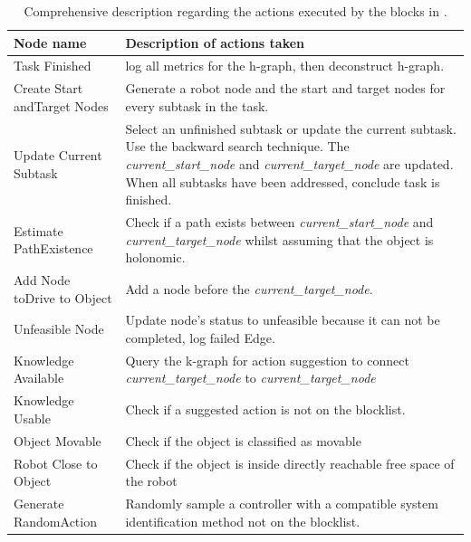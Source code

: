 

\begin{table}[H]
\caption{Comprehensive description regarding the actions executed by the blocks in .}%
\label{table:explainer_h-graph_figures_nodes}
\centering
{}
\begin{tabular}%
  {>{\raggedright\arraybackslash}p{}%
    >{\raggedright\arraybackslash}p{}}
\textbf{Node name} & \textbf{Description of actions taken}\\\toprule
Task Finished & log all metrics for the \ac{h-graph}, then deconstruct \ac{h-graph}.\\
Create Start and\newline Target Nodes & Generate a robot node and the start and target nodes for every subtask in the task.\\
Update Current Subtask & Select an unfinished subtask or update the current subtask. Use the backward search technique. The \textit{current\_start\_node} and \textit{current\_target\_node} are updated. When all subtasks have been addressed, conclude task is finished. \\
Estimate Path\newline Existence & Check if a path exists between \textit{current\_start\_node} and \textit{current\_target\_node} whilst assuming that the object is holonomic.\\
Add Node to\newline Drive to Object & Add a node before the \textit{current\_target\_node}.\\
Unfeasible Node & Update node's status to unfeasible because it can not be completed, log failed Edge.\\
Knowledge Available& Query the \ac{k-graph} for action suggestion to connect \textit{current\_target\_node} to \textit{current\_target\_node}\\
Knowledge Usable& Check if a suggested action is not on the blocklist.\\
Object Movable & Check if the object is classified as movable\\
Robot Close to Object& Check if the object is inside directly reachable free space of the robot \\
Generate Random\newline Action& Randomly sample a controller with a compatible system identification method not on the blocklist. \\

\end{tabular}
\end{table}
